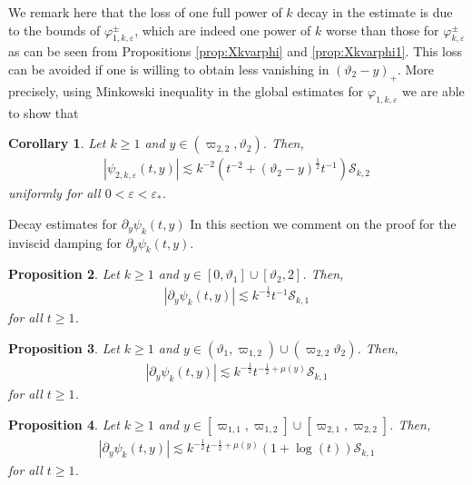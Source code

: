 \documentclass[11pt,reqno]{amsproc}
\makeatletter
\renewcommand\subsection{\@startsection{subsection}{2}%
\normalparindent{.5\linespacing\@plus.7\linespacing}{-.5em}
{\normalfont\bfseries}}
\newtheorem{proposition}{Proposition}[section]
\newtheorem{corollary}[proposition]{Corollary}
\theoremstyle{definition}
\numberwithin{equation}{section}
\newcommand{\cS}{{\mathcal S}}
\newcommand{\ep}{\varepsilon}
\makeatother
\begin{document}
We remark here that the loss of one full power of $k$ decay in the estimate is due to the bounds of $\varphi_{1,k,\ep}^\pm$, which are indeed one power of $k$ worse than those for $\varphi_{k,\ep}^\pm$ as can be seen from Propositions \ref{prop:Xkvarphi} and \ref{prop:Xkvarphi1}. This loss can be avoided if one is willing to obtain less vanishing in $(\vartheta_2-y)_+$. More precisely, using Minkowski inequality in the global estimates for $\varphi_{1,k,\ep}$ we are able to show that

\begin{corollary}\label{cor:secondintegralIDpsiweak}
Let $k\geq 1$ and $y\in (\varpi_{2,2}, \vartheta_2)$. Then,
\begin{align*}
\left| \psi_{2,k,\ep}(t,y) \right| \lesssim k^{-2}\left( t^{-2} + (\vartheta_2-y)^\frac12 t^{-1} \right)\cS_{k,2} 
\end{align*}
uniformly for all $0<\ep<\ep_*$.
\end{corollary}



\subsection{Decay estimates for $\partial_y\psi_k(t,y)$}\label{sec:timedecaypypsi} In this section we comment on the proof for the inviscid damping for $\partial_y\psi_k(t,y)$. 

\begin{proposition}\label{prop:IDpypsinonstrat}
Let $k\geq 1$ and $y\in [0,\vartheta_1]\cup [\vartheta_2,2]$. Then,
\begin{align*}
\left| \partial_y\psi_k(t,y) \right| \lesssim k^{-\frac12} t^{-1}\cS_{k,1}
\end{align*} 
for all $t\geq 1$.
\end{proposition}

\begin{proposition}\label{prop:IDpypsiweak}
Let $k\geq 1$ and $y\in (\vartheta_1,\varpi_{1,2})\cup (\varpi_{2,2}\vartheta_2)$. Then,
\begin{align*}
\left| \partial_y\psi_k(t,y) \right| \lesssim k^{-\frac12}t^{-\frac12+\mu(y)}\cS_{k,1}
\end{align*} 
for all $t\geq 1$.
\end{proposition}

\begin{proposition}\label{prop:IDpypsimild}
Let $k\geq 1$ and $y\in [\varpi_{1,1}, \varpi_{1,2}]\cup [\varpi_{2,1}, \varpi_{2,2}]$. Then,
\begin{align*}
\left| \partial_y\psi_k(t,y) \right| \lesssim k^{-\frac12} t^{-\frac12+\mu(y)} \left( 1 + \log(t) \right) \cS_{k,1}
\end{align*} 
for all $t\geq 1$.
\end{proposition}
\end{document}
